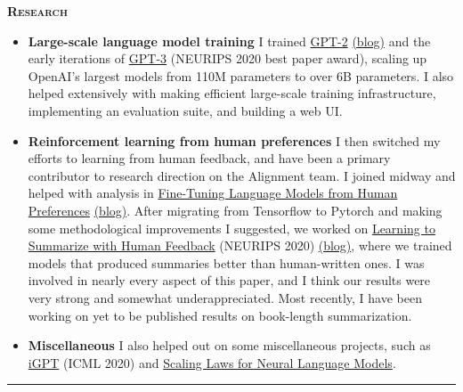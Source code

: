 \documentclass[11 pt]{article}
\begin{document}
\begin{center}\begin{Large}\textsc{\textbf{Research}\\}\end{Large}\end{center}
\begin{itemize}

\item \textbf{Large-scale language model training}
  I trained \href{https://d4mucfpksywv.cloudfront.net/better-language-models/language_models_are_unsupervised_multitask_learners.pdf}{GPT-2} \href{https://openai.com/blog/better-language-models/}{(blog)} and the early iterations of \href{https://arxiv.org/pdf/2005.14165.pdf}{GPT-3} (NEURIPS 2020 best paper award), scaling up OpenAI's largest models from 110M parameters to over 6B parameters.  I also helped extensively with making efficient large-scale training infrastructure, implementing an evaluation suite, and building a web UI.

\item \textbf{Reinforcement learning from human preferences}
  I then switched my efforts to learning from human feedback, and have been a primary contributor to research direction on the Alignment team. I joined midway and helped with analysis in \href{https://arxiv.org/abs/1909.08593}{Fine-Tuning Language Models from Human Preferences} \href{https://openai.com/blog/fine-tuning-gpt-2/}{(blog)}.  After migrating from Tensorflow to Pytorch and making some methodological improvements I suggested, we worked on \href{https://arxiv.org/abs/2009.01325}{Learning to Summarize with Human Feedback} (NEURIPS 2020) \href{https://openai.com/blog/learning-to-summarize-with-human-feedback/}{(blog)}, where we trained models that produced summaries better than human-written ones.
  I was involved in nearly every aspect of this paper, %
  and I think our results were very strong and somewhat underappreciated.
  Most recently, I have been working on yet to be published results on book-length summarization.

\item \textbf{Miscellaneous}
  I also helped out on some miscellaneous projects, such as \href{https://cdn.openai.com/papers/Generative_Pretraining_from_Pixels_V2.pdf}{iGPT} (ICML 2020) and \href{https://arxiv.org/abs/2001.08361}{Scaling Laws for Neural Language Models}. \\

\end{itemize}
\hrule
\end{document}
